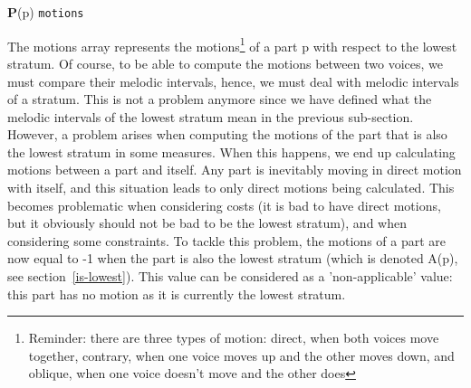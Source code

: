 \vspace{.5cm}
\noindent \textbf{P}(p) \hspace*{.2cm} \texttt{motions}

The motions array represents the motions\footnote{Reminder: there are three types of motion: direct, when both voices move together, contrary, when one voice moves up and the other moves down, and oblique, when one voice doesn't move and the other does} of a part p with respect to the lowest stratum. Of course, to be able to compute the motions between two voices, we must compare their melodic intervals, hence, we must deal with melodic intervals of a stratum. This is not a problem anymore since we have defined what the melodic intervals of the lowest stratum mean in the previous sub-section.
However, a problem arises when computing the motions of the part that is also the lowest stratum in some measures. When this happens, we end up calculating motions between a part and itself. Any part is inevitably moving in direct motion with itself, and this situation leads to only direct motions being calculated. This becomes problematic when considering costs (it is bad to have direct motions, but it obviously should not be bad to be the lowest stratum), and when considering some constraints. To tackle this problem, the motions of a part are now equal to -1 when the part is also the lowest stratum (which is denoted A(p), see section~\ref{is-lowest}). This value can be considered as a 'non-applicable' value: this part has no motion as it is currently the lowest stratum.

